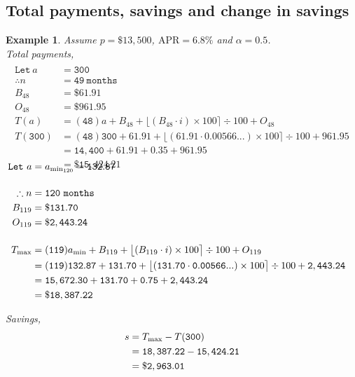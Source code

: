 \documentclass[12pt,letterpaper,oneside]{article}
\newtheorem{example}{Example}[section]
\theoremstyle{remark} %
\begin{document}
	\newpage
	\subsection{Total payments, savings and change in savings}
	\setcounter{example}{0} %
	\begin{example}
	Assume $p=\$13,500$, $\mbox{APR}=6.8\%$ and $\alpha=0.5$.\\[12pt]
	Total payments,
	\begin{align*}
	\\\mathtt{Let\ } a&=\mathtt{300}\\[12pt]
	\therefore n&=\mathtt{49\ months}\\
	B_{48}&=\mathtt{\$61.91}\\
	O_{48}&=\mathtt{\$961.95}\\[12pt]
	T(a)&=(\mathtt{48}) a+B_{48}+\big\lfloor{\left(B_{48}\cdot i\right)\times 100}\big\rceil\div 100+O_{48}\\
	T(\mathtt{300})&=(\mathtt{48}) \mathtt{300}+\mathtt{61.91}+\big\lfloor{\left(\mathtt{61.91}\cdot \mathtt{0.00566...}\right)\times 100}\big\rceil\div 100+\mathtt{961.95}\\
	&=\mathtt{14,400}+\mathtt{61.91}+\mathtt{0.35}+\mathtt{961.95}\\
	&=\mathtt{\$15,424.21}
	\end{align*}

	\label{amina}
	\begin{align*}\\[-36pt]
	\mathtt{Let\ } a&=a_{\rm{min_{120}}}=\mathtt{132.87}\\[12pt]
	\therefore n&=\mathtt{120\ months}\\
	B_{119}&=\mathtt{\$131.70}\\
	O_{119}&=\mathtt{\$2,443.24}\\[12pt]	
	T_{\rm{max}}&=(\mathtt{119}) a_{\rm{min}}+B_{119}+\big\lfloor{\left(B_{119}\cdot i\right)\times 100}\big\rceil\div 100+O_{119}\\
	&=(\mathtt{119}) \mathtt{132.87}+\mathtt{131.70}+\big\lfloor{\left(\mathtt{131.70}\cdot \mathtt{0.00566...}\right)\times 100}\big\rceil\div 100+\mathtt{2,443.24}\\
	&=\mathtt{15,672.30}+\mathtt{131.70}+\mathtt{0.75}+\mathtt{2,443.24}\\
	&=\mathtt{\$18,387.22}
	\end{align*}

	\vspace{12pt}
	Savings,
	\begin{align*}
	s&=T_{\rm{max}}-T(\mathtt{300})\\
	&=\mathtt{18,387.22}-\mathtt{15,424.21}\\
	&=\mathtt{\$2,963.01}
	\end{align*}


\end{example}
\end{document}
